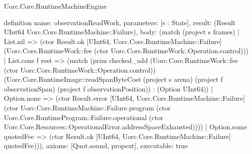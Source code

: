 \begin{lexlean}{Uorc.Core.RuntimeMachineEngine}
\begin{semanticmodule}
definition{
  name: observationReadWork,
  parameters: [s : State],
  result: (Result UInt64 Uorc.Core.RuntimeMachine::Failure),
  body: (match (project s frames)
    | List.nil => (ctor Result.ok [UInt64, Uorc.Core.RuntimeMachine::Failure] (Uorc.Core.RuntimeWork::fee (ctor Uorc.Core.RuntimeWork::Operation.control)))
    | List.cons f rest => (match (prim checked_add (Uorc.Core.RuntimeWork::fee (ctor Uorc.Core.RuntimeWork::Operation.control)) (Uorc.Core.RuntimeImage::readSpanByteCost (project s arena) (project f observationSpan) (project f observationPosition)) : (Option UInt64))
      | Option.none => (ctor Result.error [UInt64, Uorc.Core.RuntimeMachine::Failure] (ctor Uorc.Core.RuntimeMachine::Failure.program (ctor Uorc.Core.RuntimeProgram::Failure.operational (ctor Uorc.Core.Resources::OperationalError.addressSpaceExhausted))))
      | Option.some quotedFee => (ctor Result.ok [UInt64, Uorc.Core.RuntimeMachine::Failure] quotedFee))),
  axioms: [Quot.sound, propext],
  executable: true
}


\end{semanticmodule}
\end{lexlean}
